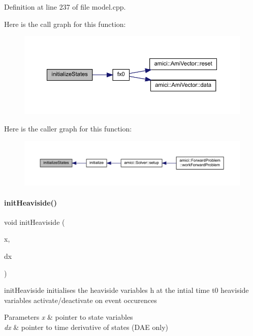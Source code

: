 Definition at line 237 of file model.\+cpp.

Here is the call graph for this function\+:
\nopagebreak
\begin{figure}[H]
\begin{center}
\leavevmode
\includegraphics[width=350pt]{classamici_1_1_model_a73d147a7108479e20833ba816cac0f6b_cgraph}
\end{center}
\end{figure}
Here is the caller graph for this function\+:
\nopagebreak
\begin{figure}[H]
\begin{center}
\leavevmode
\includegraphics[width=350pt]{classamici_1_1_model_a73d147a7108479e20833ba816cac0f6b_icgraph}
\end{center}
\end{figure}
\mbox{\label{classamici_1_1_model_afc1c1ffc33f397ed131f85c8321dd677}} 
\paragraph{\texorpdfstring{init\+Heaviside()}{initHeaviside()}}
{\footnotesize\ttfamily void init\+Heaviside (\begin{DoxyParamCaption}\item[{\mbox{\hyperlink{classamici_1_1_ami_vector}{Ami\+Vector}} $\ast$}]{x,  }\item[{\mbox{\hyperlink{classamici_1_1_ami_vector}{Ami\+Vector}} $\ast$}]{dx }\end{DoxyParamCaption})}

init\+Heaviside initialises the heaviside variables h at the intial time t0 heaviside variables activate/deactivate on event occurences 
\begin{DoxyParams}{Parameters}
{\em x} & pointer to state variables \\
\hline
{\em dx} & pointer to time derivative of states (D\+AE only) \\
\hline
\end{DoxyParams}


